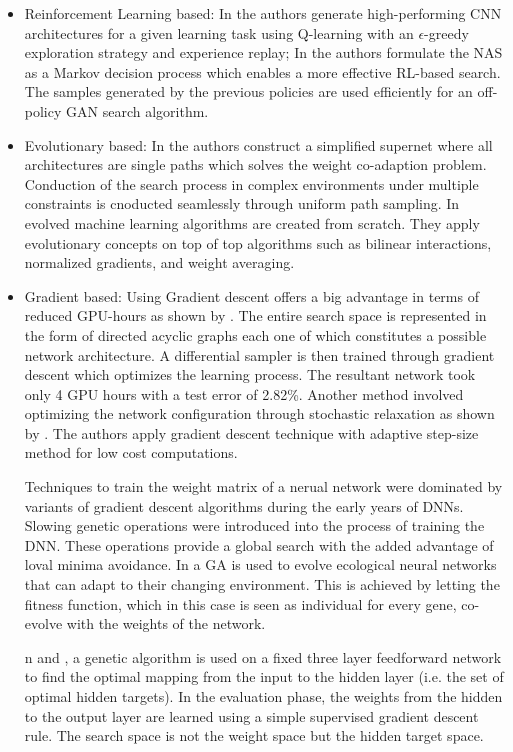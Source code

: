 \documentclass[conference]{IEEEtran}
\begin{document}
\begin{itemize}
\item Reinforcement Learning based: In \cite{RWRL1} the authors generate high-performing CNN architectures for a given learning task using Q-learning with an $\epsilon$-greedy exploration strategy and experience replay; In \cite{RWRL2} the authors formulate the NAS as a Markov decision process which enables a more effective RL-based search. The samples generated by the previous policies are used efficiently for an off-policy GAN search algorithm.
\item Evolutionary based: In \cite{EA1} the authors construct a simplified supernet where all architectures are single paths which solves the weight co-adaption problem. Conduction of the search process in complex environments under multiple constraints is cnoducted seamlessly through uniform path sampling. In \cite{EA2} evolved machine learning algorithms are created from scratch. They apply evolutionary concepts on top of top algorithms such as bilinear interactions, normalized gradients, and weight averaging. 
\item Gradient based: Using Gradient descent offers a big advantage in terms of reduced GPU-hours as shown by \cite{GD1}. The entire search space is represented in the form of directed acyclic graphs each one of which constitutes a possible network architecture. A differential sampler is then trained through gradient descent which optimizes the learning process. The resultant network took only 4 GPU hours with a test error of 2.82\%. Another method involved optimizing the network configuration through stochastic relaxation as shown by \cite{GD2}. The authors apply gradient descent technique with adaptive step-size method for low cost computations.    

Techniques to train the weight matrix of a nerual network were dominated by variants of gradient descent algorithms during the early years of DNNs. Slowing genetic operations were introduced into the process of training the DNN. These operations provide a global search with the added advantage of loval minima avoidance. In \cite{lund} a GA is used to evolve ecological neural networks that can adapt to their changing environment. This is achieved by letting the fitness function, which in this case is seen as individual for every gene, co-evolve with the weights of the network.

n \cite{hass} and \cite{munro}, a genetic algorithm is used on a fixed three layer feedforward network to find the optimal mapping from the input to the hidden layer (i.e. the set of optimal hidden targets). In the evaluation phase, the weights from the hidden to the output layer are learned using a simple supervised gradient descent rule. The search space is not the weight space but the hidden target space.
\end{itemize}
\end{document}
